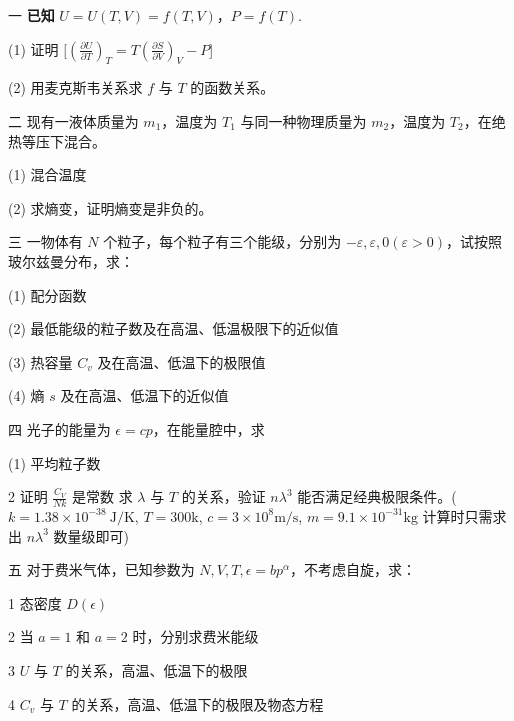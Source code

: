 一 \textbf{已知} $U = U(T, V) = f(T, V)$，$P = f(T)$.

(1) 证明
 $[\left( \frac{\partial U}{\partial T} \right)_T = T \left( \frac{\partial S}{\partial V} \right)_V - P$]

(2) 用麦克斯韦关系求 $f$ 与 $T$ 的函数关系。

二 现有一液体质量为 $m_1$，温度为 $T_1$ 与同一种物理质量为 $m_2$，温度为 $T_2$，在绝热等压下混合。

(1) 混合温度

(2) 求熵变，证明熵变是非负的。

三 一物体有 $N$ 个粒子，每个粒子有三个能级，分别为 $-\varepsilon, \varepsilon, 0 (\varepsilon > 0)$，试按照玻尔兹曼分布，求：

(1) 配分函数

(2) 最低能级的粒子数及在高温、低温极限下的近似值

(3) 热容量 $C_v$ 及在高温、低温下的极限值

(4) 熵 $s$ 及在高温、低温下的近似值

四 光子的能量为 $\epsilon = cp$，在能量腔中，求

(1) 平均粒子数

{2} 证明 $\frac{C_V}{Nk}$ 是常数
求 $\lambda$ 与 $T$ 的关系，验证 $n \lambda^3$ 能否满足经典极限条件。($k=1.38 \times 10^{-38} \ \text{J/K}$, $T=300 \text{k}$, $c=3 \times 10^8 \text{m/s}$, $m=9.1 \times 10^{-31} \text{kg}$ 计算时只需求出 $n \lambda^3$ 数量级即可)



五 对于费米气体，已知参数为 $N, V, T, \epsilon = b p^\alpha$，不考虑自旋，求：


{1} 态密度 $D(\epsilon)$

{2} 当 $a=1$ 和 $a=2$ 时，分别求费米能级

{3} $U$ 与 $T$ 的关系，高温、低温下的极限

{4} $C_v$ 与 $T$ 的关系，高温、低温下的极限及物态方程
